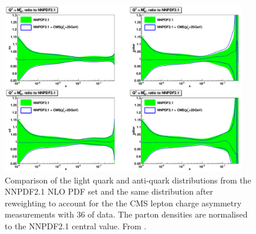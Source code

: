 \begin{figure}[htbp]
  \begin{center}
  \includegraphics*[width=0.95\textwidth]{effect}
  \caption{Comparison of the light quark and anti-quark distributions from the
NNPDF2.1 NLO PDF set and the same distribution after reweighting to account for
the the CMS lepton charge asymmetry measurements with \unit{36}{\invpb} of data.
The parton densities are normalised to the NNPDF2.1 central value.  From
\cite{Ball:2011gg}. } \label{fig:effect}
  \end{center}
\end{figure}



